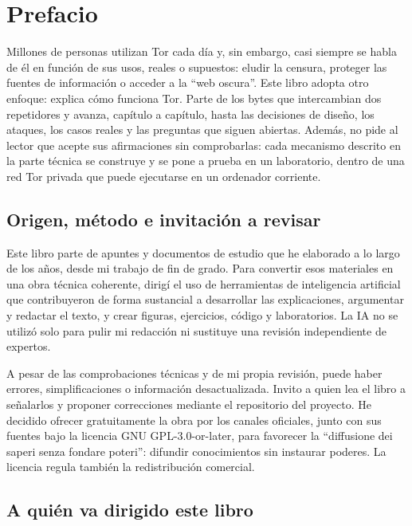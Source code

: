 \chapter{Prefacio}

Millones de personas utilizan Tor cada día y, sin embargo, casi siempre se habla de él en función de sus usos, reales o supuestos: eludir la censura, proteger las fuentes de información o acceder a la \enquote{web oscura}. Este libro adopta otro enfoque: explica cómo funciona Tor. Parte de los bytes que intercambian dos repetidores y avanza, capítulo a capítulo, hasta las decisiones de diseño, los ataques, los casos reales y las preguntas que siguen abiertas. Además, no pide al lector que acepte sus afirmaciones sin comprobarlas: cada mecanismo descrito en la parte técnica se construye y se pone a prueba en un laboratorio, dentro de una red Tor privada que puede ejecutarse en un ordenador corriente.

\section*{Origen, método e invitación a revisar}

Este libro parte de apuntes y documentos de estudio que he elaborado a lo largo de los años, desde mi trabajo de fin de grado. Para convertir esos materiales en una obra técnica coherente, dirigí el uso de herramientas de inteligencia artificial que contribuyeron de forma sustancial a desarrollar las explicaciones, argumentar y redactar el texto, y crear figuras, ejercicios, código y laboratorios. La IA no se utilizó solo para pulir mi redacción ni sustituye una revisión independiente de expertos.

A pesar de las comprobaciones técnicas y de mi propia revisión, puede haber errores, simplificaciones o información desactualizada. Invito a quien lea el libro a señalarlos y proponer correcciones mediante el repositorio del proyecto. He decidido ofrecer gratuitamente la obra por los canales oficiales, junto con sus fuentes bajo la licencia GNU GPL-3.0-or-later, para favorecer la \enquote{diffusione dei saperi senza fondare poteri}: difundir conocimientos sin instaurar poderes. La licencia regula también la redistribución comercial.

\section*{A quién va dirigido este libro}

